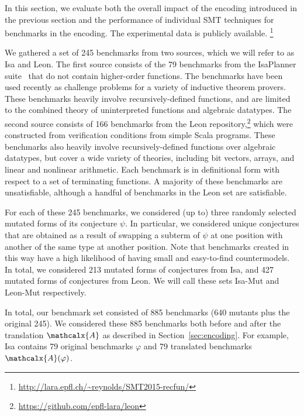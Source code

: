 \documentclass[runningheads,a4paper]{llncs}
\newcommand\isa{Isa\xspace}
\newcommand\isam{Isa-Mut\xspace}
\newcommand\leon{Leon\xspace}
\newcommand\leonm{Leon-Mut\xspace}
\newcommand{\conv}{\mathcalx{A}}
\begin{document}
In this section, we evaluate both the overall impact of the encoding introduced
in the previous section and the performance of individual SMT techniques for
benchmarks in the encoding.
The experimental data is publicly available.%
\footnote{\url{http://lara.epfl.ch/~reynolds/SMT2015-recfun/}}

We gathered a set of 245 benchmarks from two sources, which we will refer to as
\isa and \leon. The first source consists of the 79
benchmarks from the IsaPlanner
suite~\cite{DBLP:conf/itp/JohanssonDB10} that do not contain higher-order
functions. The benchmarks have been used recently as challenge problems for a
variety of inductive theorem provers. These benchmarks heavily involve
recursively-defined functions, and are limited to the combined theory of uninterpreted
functions and algebraic datatypes. The second source consists of 166
benchmarks from the Leon repository,\footnote{%
\url{https://github.com/epfl-lara/leon}} which were constructed from
verification conditions from simple Scala programs. These benchmarks also
heavily involve recursively-defined functions over algebraic datatypes, 
but cover a wide variety of theories, including bit vectors, arrays, and linear and
nonlinear arithmetic. Each benchmark is in definitional form with respect to a
set of terminating functions.
%
A majority of these benchmarks are unsatisfiable, although a
handful of benchmarks in the \leon set are satisfiable.

For each of these 245 benchmarks, we considered (up to) three randomly selected
mutated forms of its conjecture $\psi$. In particular, we considered unique
conjectures that are obtained as a result of swapping a subterm of $\psi$ at
one position with another of the same type at another position.
Note that benchmarks created in this way have a high likelihood of having small
and easy-to-find countermodels. In total, we considered 213 mutated forms of
conjectures from \isa, and 427 mutated forms of conjectures from \leon. We will
call these sets \isam and \leonm respectively.

In total, our benchmark set consisted of 885 benchmarks (640 mutants plus the
original 245). We considered these 885 benchmarks both before and after the
translation $\conv$ as described in Section~\ref{sec:encoding}. For example,
\isa contains 79 original benchmarks $\varphi$ and 79 translated benchmarks
$\conv(\varphi)$.
\end{document}
